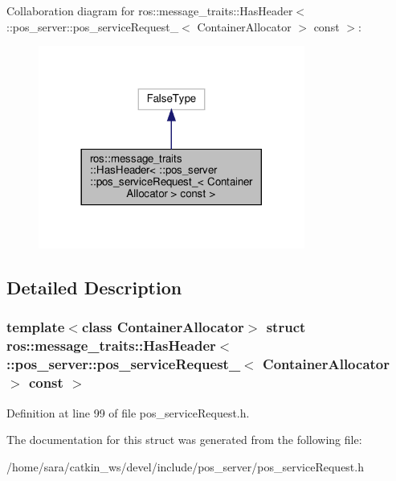 Collaboration diagram for ros\+:\+:message\+\_\+traits\+:\+:Has\+Header$<$ \+:\+:pos\+\_\+server\+:\+:pos\+\_\+service\+Request\+\_\+$<$ Container\+Allocator $>$ const $>$\+:
\nopagebreak
\begin{figure}[H]
\begin{center}
\leavevmode
\includegraphics[width=248pt]{structros_1_1message__traits_1_1HasHeader_3_01_1_1pos__server_1_1pos__serviceRequest___3_01Conta74e3368ebc7a24f0f011980a2cbdc0b4}
\end{center}
\end{figure}


\subsection{Detailed Description}
\subsubsection*{template$<$class Container\+Allocator$>$\newline
struct ros\+::message\+\_\+traits\+::\+Has\+Header$<$ \+::pos\+\_\+server\+::pos\+\_\+service\+Request\+\_\+$<$ Container\+Allocator $>$ const $>$}



Definition at line 99 of file pos\+\_\+service\+Request.\+h.



The documentation for this struct was generated from the following file\+:\begin{DoxyCompactItemize}
\item 
/home/sara/catkin\+\_\+ws/devel/include/pos\+\_\+server/pos\+\_\+service\+Request.\+h\end{DoxyCompactItemize}
